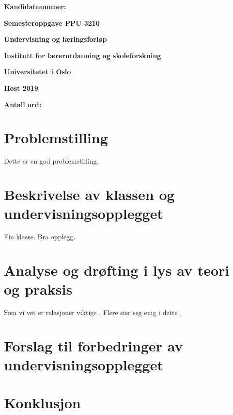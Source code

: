 \documentclass{article}
\begin{document}
\begin{titlepage}  %
    \begin{center}
        \vspace{1cm}
        
        \textbf{Kandidatnummer: }
        
        \textbf{Semesteroppgave PPU 3210}
        
        \textbf{Undervisning og læringsforløp}
        
        \textbf{Institutt for lærerutdanning og skoleforskning}
        
        \textbf{Universitetet i Oslo}
        
        \textbf{Høst 2019}
        
        \textbf{Antall ord: }
        
    \end{center}
\end{titlepage}

\section*{Problemstilling} %

Dette er en god problemstilling.

\section*{Beskrivelse av klassen og undervisningsopplegget}

Fin klasse. Bra opplegg. 
\section*{Analyse og drøfting i lys av teori og praksis}

Som vi vet er relasjoner viktige \cite[s.~48]{drugli2012}.   %
Flere sier seg enig i dette \cite{ogden2012}. %

\section*{Forslag til forbedringer av undervisningsopplegget}

\section*{Konklusjon}



\end{document}
